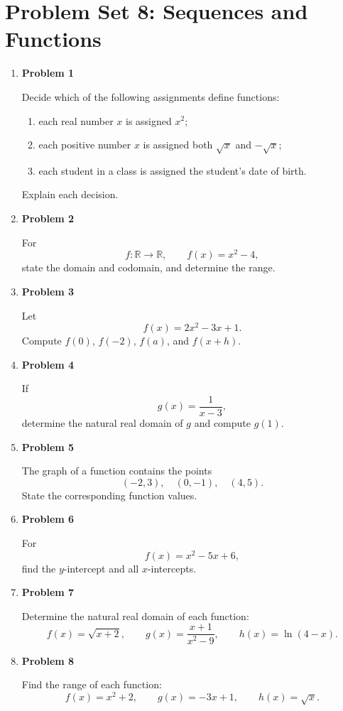 \section{Problem Set 8: Sequences and Functions}

\begin{enumerate}
\item \textbf{Problem 1}\par
Decide which of the following assignments define functions:
\begin{enumerate}
\item each real number \(x\) is assigned \(x^2\);
\item each positive number \(x\) is assigned both \(\sqrt{x}\) and \(-\sqrt{x}\);
\item each student in a class is assigned the student's date of birth.
\end{enumerate}
Explain each decision.

\item \textbf{Problem 2}\par
For
\[
f:\mathbb{R}\to\mathbb{R},
\qquad
f(x)=x^2-4,
\]
state the domain and codomain, and determine the range.

\item \textbf{Problem 3}\par
Let
\[
f(x)=2x^2-3x+1.
\]
Compute \(f(0)\), \(f(-2)\), \(f(a)\), and \(f(x+h)\).

\item \textbf{Problem 4}\par
If
\[
g(x)=\frac{1}{x-3},
\]
determine the natural real domain of \(g\) and compute \(g(1)\).

\item \textbf{Problem 5}\par
The graph of a function contains the points
\[
(-2,3),\quad (0,-1),\quad (4,5).
\]
State the corresponding function values.

\item \textbf{Problem 6}\par
For
\[
f(x)=x^2-5x+6,
\]
find the \(y\)-intercept and all \(x\)-intercepts.

\item \textbf{Problem 7}\par
Determine the natural real domain of each function:
\[
f(x)=\sqrt{x+2},
\qquad
g(x)=\frac{x+1}{x^2-9},
\qquad
h(x)=\ln(4-x).
\]

\item \textbf{Problem 8}\par
Find the range of each function:
\[
f(x)=x^2+2,
\qquad
g(x)=-3x+1,
\qquad
h(x)=\sqrt{x}.
\]


\end{enumerate}
